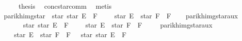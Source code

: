 \begin{isabellebody}
\ \ \isamarkupfalse%
\ \isamarkupfalse%
\ {\isacharquery}{\kern0pt}thesis\ \isamarkupfalse%
\ conc{\isacharunderscore}{\kern0pt}star{\isacharunderscore}{\kern0pt}comm\ \isamarkupfalse%
\ metis\isanewline
{}\isamarkupfalse%
%
\endisatagproof
{\isafoldproof}%
%
\isadelimproof
\isanewline
%
\endisadelimproof
\isanewline
{}\isamarkupfalse%
\ parikh{\isacharunderscore}{\kern0pt}img{\isacharunderscore}{\kern0pt}star{}{\isacharcolon}{\kern0pt}\ {\isachardoublequoteopen}{\isasymPsi}\ {\isacharparenleft}{\kern0pt}star\ {\isacharparenleft}{\kern0pt}star\ E\ {\isacharat}{\kern0pt}{\isacharat}{\kern0pt}\ F{\isacharparenright}{\kern0pt}{\isacharparenright}{\kern0pt}\ {\isacharequal}{\kern0pt}\ {\isasymPsi}\ {\isacharparenleft}{\kern0pt}{\isacharbraceleft}{\kern0pt}{\isacharbrackleft}{\kern0pt}{\isacharbrackright}{\kern0pt}{\isacharbraceright}{\kern0pt}\ {\isasymunion}\ star\ E\ {\isacharat}{\kern0pt}{\isacharat}{\kern0pt}\ star\ F\ {\isacharat}{\kern0pt}{\isacharat}{\kern0pt}\ F{\isacharparenright}{\kern0pt}{\isachardoublequoteclose}\isanewline
%
\isadelimproof
%
\endisadelimproof
%
\isatagproof
{}\isamarkupfalse%
\isanewline
\ \ \isamarkupfalse%
\ parikh{\isacharunderscore}{\kern0pt}img{\isacharunderscore}{\kern0pt}star{}{\isacharunderscore}{\kern0pt}aux{}\isanewline
\ \ \ \ \isamarkupfalse%
\ {\isachardoublequoteopen}{\isasymPsi}\ {\isacharparenleft}{\kern0pt}star\ {\isacharparenleft}{\kern0pt}star\ E\ {\isacharat}{\kern0pt}{\isacharat}{\kern0pt}\ F{\isacharparenright}{\kern0pt}{\isacharparenright}{\kern0pt}\ {\isasymsubseteq}\ {\isasymPsi}\ {\isacharparenleft}{\kern0pt}{\isacharbraceleft}{\kern0pt}{\isacharbrackleft}{\kern0pt}{\isacharbrackright}{\kern0pt}{\isacharbraceright}{\kern0pt}\ {\isasymunion}\ star\ E\ {\isacharat}{\kern0pt}{\isacharat}{\kern0pt}\ star\ F\ {\isacharat}{\kern0pt}{\isacharat}{\kern0pt}\ F{\isacharparenright}{\kern0pt}{\isachardoublequoteclose}\ \isakeywordONE{{\isachardot}{\kern0pt}}\isamarkupfalse%
\isanewline
\ \ \isamarkupfalse%
\ parikh{\isacharunderscore}{\kern0pt}img{\isacharunderscore}{\kern0pt}star{}{\isacharunderscore}{\kern0pt}aux{}\isanewline
\ \ \ \ \isamarkupfalse%
\ {\isachardoublequoteopen}{\isasymPsi}\ {\isacharparenleft}{\kern0pt}{\isacharbraceleft}{\kern0pt}{\isacharbrackleft}{\kern0pt}{\isacharbrackright}{\kern0pt}{\isacharbraceright}{\kern0pt}\ {\isasymunion}\ star\ E\ {\isacharat}{\kern0pt}{\isacharat}{\kern0pt}\ star\ F\ {\isacharat}{\kern0pt}{\isacharat}{\kern0pt}\ F{\isacharparenright}{\kern0pt}\ {\isasymsubseteq}\ {\isasymPsi}\ {\isacharparenleft}{\kern0pt}star\ {\isacharparenleft}{\kern0pt}star\ E\ {\isacharat}{\kern0pt}{\isacharat}{\kern0pt}\ F{\isacharparenright}{\kern0pt}{\isacharparenright}{\kern0pt}{\isachardoublequoteclose}\isanewline

\end{isabellebody}
